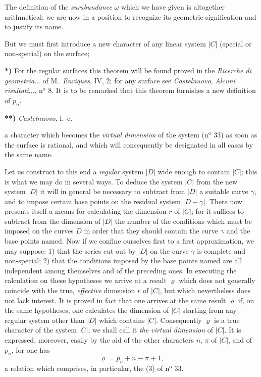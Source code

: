 \documentclass{article}
\begin{document}
The definition of the \emph{surabundance} $\omega$ which we have given is altogether arithmetical; we are now in a position to recognize its geometric signification and to justify its name.

But we must first introduce a new character of any linear system $|C|$ (special or non-special) on the surface;

\textbf{*)} For the regular surfaces this theorem will be found proved in the \emph{Ricerche di geometria}... of M.\ \emph{Enriques}, IV, 2; for any surface see \emph{Castelnuovo}, \emph{Alcuni risultati}..., n${}^{\text{o}}$ 8. It is to be remarked that this theorem furnishes a new definition of $p_{n}$.

\textbf{**)} \emph{Castelnuovo}, l.\ c.

a character which becomes the \emph{virtual dimension} of the system (n${}^{\text{o}}$ 33) as soon as the surface is rational, and which will consequently be designated in all cases by the same name.

Let us construct to this end a \emph{regular} system $|D|$ wide enough to contain $|C|$; this is what we may do in several ways. To deduce the system $|C|$ from the new system $|D|$ it will in general be necessary to subtract from $|D|$ a suitable curve $\gamma$, and to impose certain base points on the residual system $|D-\gamma|$. There now presents itself a means for calculating the dimension $r$ of $|C|$; for it suffices to subtract from the dimension of $|D|$ the number of the conditions which must be imposed on the curves $D$ in order that they should contain the curve $\gamma$ and the base points named. Now if we confine ourselves first to a first approximation, we may suppose: 1) that the series cut out by $|D|$ on the curve $\gamma$ is complete and non-special; 2) that the conditions imposed by the base points named are all independent among themselves and of the preceding ones. In executing the calculation on these hypotheses we arrive at a result $\varrho$ which does not generally coincide with the true, \emph{effective} dimension $r$ of $|C|$, but which nevertheless does not lack interest. It is proved in fact that one arrives at the same result $\varrho$ if, on the same hypotheses, one calculates the dimension of $|C|$ starting from any regular system other than $|D|$ which contains $|C|$. Consequently $\varrho$ is a true character of the system $|C|$; we shall call it \emph{the virtual dimension} of $|C|$. It is expressed, moreover, easily by the aid of the other characters $n$, $\pi$ of $|C|$, and of $p_{n}$, for one has
\[ \varrho = p_{n} + n - \pi + 1, \tag{6} \]
a relation which comprises, in particular, the (3) of n${}^{\text{o}}$ 33.
\end{document}
